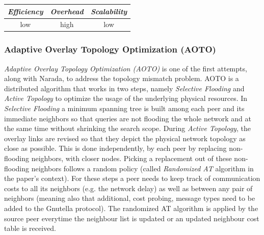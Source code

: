 \begin{center}
\begin{tabular}{ccc}
\emph{Efficiency} & \emph{Overhead} & \emph{Scalability} \\
\hline
%
low &
high &
%
low
\end{tabular}
\end{center}

\subsubsection{Adaptive Overlay Topology Optimization (AOTO)}
\emph{Adaptive Overlay Topology Optimization (AOTO)} \cite{LZXN2003} is one
of the first attempts, along with Narada, to address the topology mismatch
problem. AOTO is a distributed algorithm that works in two steps, namely
\emph{Selective Flooding} and \emph{Active Topology} to optimize the usage of
the underlying physical resources. In \emph{Selective Flooding} a minimum
spanning tree is built among each peer and its immediate neighbors so that
queries are not flooding the whole network and at the same time without
shrinking the search scope. During \emph{Active Topology}, the overlay
links are revised so that they depict the physical network topology as close as
possible. This is done independently, by each peer by replacing non-flooding
neighbors, with closer nodes. Picking a replacement out of these non-flooding
neighbors follows a random policy (called \emph{Randomized AT} algorithm in the
paper's context). For these steps a peer needs to keep track of communication
costs to all its neighbors (e.g. the network delay) as well as between any
pair of neighbors (meaning also that additional, cost probing, message types
need to be added to the Gnutella protocol). The randomized AT algorithm is
applied by the source peer everytime the neighbour list is updated or an updated
neighbour cost table is received.

